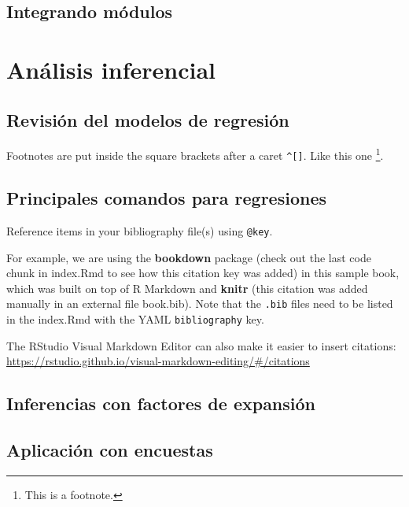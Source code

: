 \documentclass[
]{book}
\theoremstyle{definition}
\theoremstyle{definition}
\theoremstyle{definition}
\theoremstyle{definition}
\theoremstyle{remark}
\begin{document}
\hypertarget{integrando-muxf3dulos}{%
\section{Integrando módulos}\label{integrando-muxf3dulos}}

\hypertarget{anuxe1lisis-inferencial}{%
\chapter{Análisis inferencial}\label{anuxe1lisis-inferencial}}

\hypertarget{revisiuxf3n-del-modelos-de-regresiuxf3n}{%
\section{Revisión del modelos de regresión}\label{revisiuxf3n-del-modelos-de-regresiuxf3n}}

Footnotes are put inside the square brackets after a caret \texttt{\^{}{[}{]}}. Like this one \footnote{This is a footnote.}.

\hypertarget{principales-comandos-para-regresiones}{%
\section{Principales comandos para regresiones}\label{principales-comandos-para-regresiones}}

Reference items in your bibliography file(s) using \texttt{@key}.

For example, we are using the \textbf{bookdown} package \citep{R-bookdown} (check out the last code chunk in index.Rmd to see how this citation key was added) in this sample book, which was built on top of R Markdown and \textbf{knitr} \citep{xie2015} (this citation was added manually in an external file book.bib).
Note that the \texttt{.bib} files need to be listed in the index.Rmd with the YAML \texttt{bibliography} key.

The RStudio Visual Markdown Editor can also make it easier to insert citations: \url{https://rstudio.github.io/visual-markdown-editing/\#/citations}

\hypertarget{inferencias-con-factores-de-expansiuxf3n}{%
\section{Inferencias con factores de expansión}\label{inferencias-con-factores-de-expansiuxf3n}}

\hypertarget{aplicaciuxf3n-con-encuestas}{%
\section{Aplicación con encuestas}\label{aplicaciuxf3n-con-encuestas}}
\end{document}
